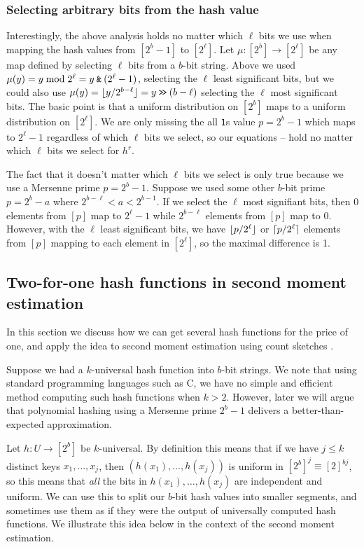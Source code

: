 \subsubsection{Selecting arbitrary bits from the hash value}
Interestingly, the above analysis holds no matter which $\ell$ bits we use when mapping the hash values from $[2^b-1]$ to $[2^\ell]$.
Let $\mu:[2^b]\to[2^\ell]$ be any map defined by selecting $\ell$ bits from a $b$-bit string.
Above we used $\mu(y)=y\bmod 2^\ell=y\mathbin{\texttt{\&}}  (2^\ell-1)$, selecting the $\ell$ least significant bits, but we could also use $\mu(y)=\lfloor {y/2^{b-\ell}} \rfloor=y\mathbin{\texttt{>\!>}} (b-\ell)$ selecting the $\ell$ most significant bits.
The basic point is that a uniform distribution on $[2^b]$ maps to a uniform distribution on $[2^\ell]$.
We are only missing the all \texttt1s value $p=2^b-1$ which maps to $2^\ell-1$ regardless of which $\ell$ bits we select, so our equations -- hold no matter which $\ell$ bits we select for $h^r$.

The fact that it doesn't matter which $\ell$ bits we select is only
true because we use a Mersenne prime $p=2^b-1$. Suppose we used some
other $b$-bit prime $p=2^b-a$ where $2^{b-\ell}<a<2^{b-1}$. If we
select the $\ell$ most signifiant bits, then $0$ elements from $[p]$
map to $2^\ell-1$ while $2^{b-\ell}$ elements from $[p]$ map to $0$. However,
with the $\ell$ least significant bits, we have $\lfloor {p/2^\ell} \rfloor$ or
$\lceil {p/2^\ell}\rceil$ elements from $[p]$ mapping to each element in
$[2^\ell]$, so the maximal difference is 1.


\subsection{Two-for-one hash functions in second moment estimation}
In this section we discuss how we can get several hash functions for
the price of one, and apply the idea to second moment estimation using
count sketches \cite{charikar04count-sketch}.

Suppose we had a $k$-universal hash function into $b$-bit strings.
We note that using standard programming languages such as C, we have
no simple and efficient method computing such hash
functions when $k>2$. However, later we will argue that polynomial
hashing using a Mersenne prime $2^b-1$ delivers a better-than-expected
approximation.

Let $h:U\to [2^b]$ be $k$-universal. By definition this
means that if we have $j\leq k$ distinct keys $x_1,\ldots,x_j$, then
$(h(x_1),\ldots,h(x_j))$ is uniform in $[2^b]^j\equiv [2]^{bj}$,
so this means that \emph{all} the bits in $h(x_1),\ldots,h(x_j)$ are
independent and uniform. We can use this to split our $b$-bit hash
values into smaller segments, and sometimes use them as if
they were the output of universally computed hash functions.
We illustrate this idea below in the context of the second moment estimation.

